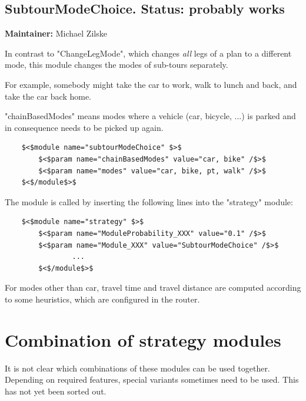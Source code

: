 \subsection{SubtourModeChoice. Status: probably works}

\textbf{Maintainer:} Michael Zilske

In contrast to "ChangeLegMode", which changes \emph{all} legs of a plan to a different mode, this module changes the modes of sub-tours separately.

For example, somebody might take the car to work, walk to lunch and back, and take the car back home.

"chainBasedModes" means modes where a vehicle (car, bicycle,  ...) is parked and in consequence needs to be picked up again.
\begin{verbatim}
	$<$module name="subtourModeChoice" $>$
		$<$param name="chainBasedModes" value="car, bike" /$>$
		$<$param name="modes" value="car, bike, pt, walk" /$>$
	$<$/module$>$

\end{verbatim}

The module is called by inserting the following lines into the "strategy" module:
\begin{verbatim}
	$<$module name="strategy" $>$
		$<$param name="ModuleProbability_XXX" value="0.1" /$>$
		$<$param name="Module_XXX" value="SubtourModeChoice" /$>$
                ...
        $<$/module$>$

\end{verbatim}


For modes other than car, travel time and travel distance are  computed according to some heuristics, which are configured in the  router.

\vfill\eject
\section{Combination of strategy modules}

It  is not clear which combinations of these modules can be used together.  Depending on required features, special variants sometimes need to be  used. This has not yet been sorted out.

